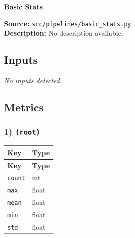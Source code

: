 \documentclass[11pt]{article}
\begin{document}
\begin{center}
\LARGE\textbf{Basic Stats}
\end{center}
\textbf{Source:} \texttt{src/\allowbreak{}pipelines/\allowbreak{}basic\_\allowbreak{}stats.py}\\
\textbf{Description:} No description available.

\subsection*{Inputs}
\emph{No inputs detected.}

\subsection*{Metrics}
\subsubsection*{1) \texttt{(root)}}
\begin{longtable}{|p{}|p{}|}
\hline
\textbf{Key} & \textbf{Type} \\ \hline
\endfirsthead
\hline
\textbf{Key} & \textbf{Type} \\ \hline
\endhead
\texttt{count} & int \\ \hline
\texttt{max} & float \\ \hline
\texttt{mean} & float \\ \hline
\texttt{min} & float \\ \hline
\texttt{std} & float \\ \hline
\end{longtable}
\end{document}
